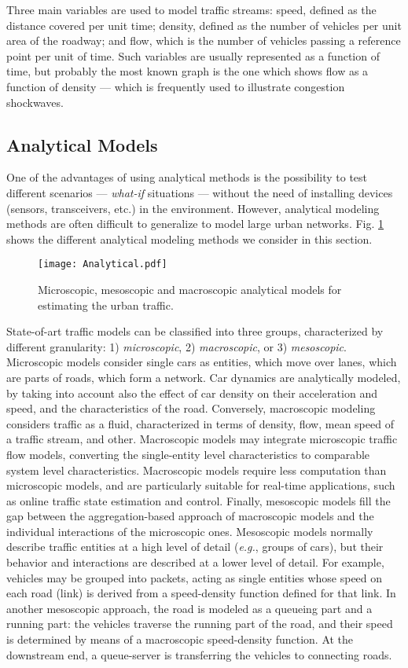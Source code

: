 \documentclass[10pt,onecolumn]{article}
\begin{document}
Three main variables are used to model traffic streams: speed, defined as the distance covered per unit time; density, defined as the number of vehicles per unit area of the roadway; and flow, which is the number of vehicles passing a reference point per unit of time. Such variables are usually represented as a function of time, but probably the most known graph is the one which shows flow as a function of density --- which is frequently used to illustrate congestion shockwaves.


\subsection{Analytical Models}

One of the advantages of using analytical methods is the possibility to test different scenarios --- \textit{what-if} situations --- without the need of installing devices (sensors, transceivers, etc.) in the environment. 
However, analytical modeling methods are often difficult to generalize to model large urban networks. Fig. \ref{fig.analytic} shows the different analytical modeling methods we consider in this section.

\begin{figure}[ht!]
\centering
\texttt{[image: Analytical.pdf]}
\caption{Microscopic, mesoscopic and macroscopic analytical models for estimating the urban traffic.}
\label{fig.analytic}
\end{figure} 

State-of-art traffic models can be classified into three groups, characterized by different granularity: 1) \textit{microscopic}, 2) \textit{macroscopic}, or 3) \textit{mesoscopic}.
Microscopic models consider single cars as entities, which move over lanes, which are parts of roads, which form a network. Car dynamics are analytically modeled, by taking into account also the effect of car density on their acceleration and speed, and the characteristics of the road. Conversely, macroscopic modeling considers traffic as a fluid, characterized in terms of density, flow, mean speed of a traffic stream, and other. Macroscopic models may integrate microscopic traffic flow models, converting the single-entity level characteristics to comparable system level characteristics.
Macroscopic models require less computation than microscopic models, and are particularly suitable for real-time applications, such as online traffic state estimation and control.
Finally, mesoscopic models fill the gap between the aggregation-based approach of macroscopic models and the individual interactions of the microscopic ones. Mesoscopic models normally describe traffic entities at a high level of detail (\textit{e.g.}, groups of cars), but their behavior and interactions are described at a lower level of detail. For example, vehicles may be grouped into packets, acting as single entities whose speed on each road (link) is derived from a speed-density function defined for that link. In another mesoscopic approach, the road is modeled as a queueing part and a running part: the vehicles traverse the running part of the road, and their speed is determined by means of a macroscopic speed-density function. At the downstream end, a queue-server is transferring the vehicles to connecting roads.
\end{document}
